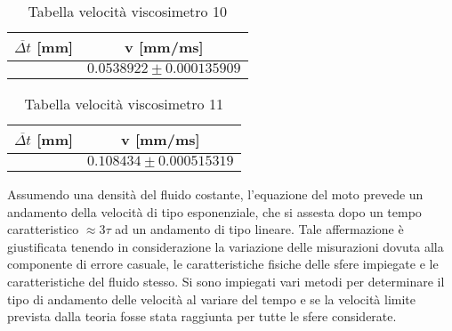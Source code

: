 \documentclass[a4paper,11pt,oneside]{article}
\begin{document}
\begin{table}[h!]
    \centering
    \begin{tabular}{|c|c|}
        \hline
        $\overline{\Delta t}$ [mm]& v [mm/ms]\\
        \hline
        \rowcolor[rgb]{0.85,0.85,0.85} & $0.0538922 \pm 0.000135909$\\
        \hline
    \end{tabular}
    \caption{Tabella velocità viscosimetro 10}
    \label{tab:vel10}
\end{table}

\begin{table}[h!]
    \centering
    \begin{tabular}{|c|c|}
        \hline
        $\overline{\Delta t}$ [mm] & v [mm/ms]\\
        \hline
        \rowcolor[rgb]{0.85,0.85,0.85} & $0.108434 \pm 0.000515319$\\
        \hline
    \end{tabular}
    \caption{Tabella velocità viscosimetro 11}
    \label{tab:vel11}
\end{table}


Assumendo una densità del fluido costante, l'equazione del moto prevede un andamento della velocità di tipo esponenziale, che si assesta dopo un tempo caratteristico $\approx 3\tau$ ad un andamento di tipo lineare. Tale affermazione è giustificata tenendo in considerazione la variazione delle misurazioni dovuta alla componente di errore casuale, le caratteristiche fisiche delle sfere impiegate e le caratteristiche del fluido stesso.\newline
Si sono impiegati vari metodi per determinare il tipo di andamento delle velocità al variare del tempo e se la velocità limite prevista dalla teoria fosse stata raggiunta per tutte le sfere considerate.
\end{document}
